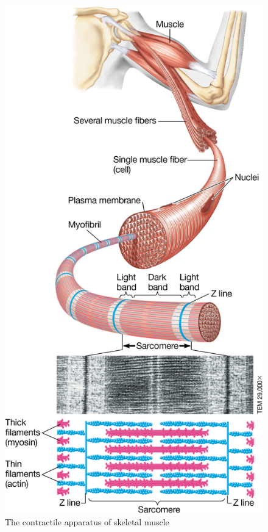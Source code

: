 \documentclass{article}
\begin{document}
\begin{figure}
  \centering
  \includegraphics[width=\linewidth]{muscle_fiber.png}
  \caption{The contractile apparatus of skeletal muscle}
\end{figure}
\end{document}
